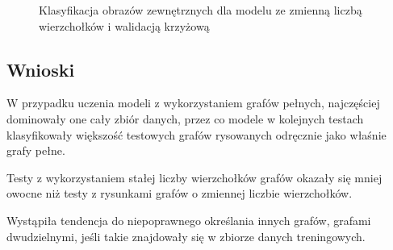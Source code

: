 \begin{figure}[ht]
	\centering
	\caption{Klasyfikacja obrazów zewnętrznych dla modelu ze zmienną liczbą wierzchołków i walidacją krzyżową}
	\label{Fig:tests-csvar-2}
\end{figure}
\FloatBarrier

\subsection{Wnioski}
W przypadku uczenia modeli z wykorzystaniem grafów pełnych, najczęściej dominowały one cały zbiór danych,
przez co modele w kolejnych testach klasyfikowały większość testowych grafów rysowanych odręcznie jako właśnie grafy pełne.

Testy z wykorzystaniem stałej liczby wierzchołków grafów okazały się mniej owocne niż testy z rysunkami grafów
o zmiennej liczbie wierzchołków.

Wystąpiła tendencja do niepoprawnego określania innych grafów, grafami dwudzielnymi, jeśli takie znajdowały się
w zbiorze danych treningowych.
